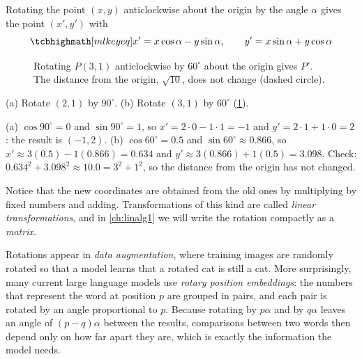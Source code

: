 \begin{theorem}\label{thm:rotation}
Rotating the point $(x, y)$ anticlockwise about the origin by the angle
$\alpha$ gives the point $(x', y')$ with
\[
  \keyeq{x' = x\cos\alpha - y\sin\alpha, \qquad y' = x\sin\alpha + y\cos\alpha}
\]
\end{theorem}

\begin{figure}[htbp]
\centering
{}
\caption{Rotating $P(3,1)$ anticlockwise by $60^\circ$ about the origin gives
  $P'$. The distance from the origin, $\sqrt{10}$, does not change (dashed
  circle).}
\label{fig:rotation}
\end{figure}

\begin{example}[Rotations]
(a) Rotate $(2, 1)$ by $90^\circ$. (b) Rotate $(3, 1)$ by $60^\circ$
(\cref{fig:rotation}).

\sol (a) $\cos90^\circ = 0$ and $\sin90^\circ = 1$, so $x' = 2\cdot0 - 1\cdot1
= -1$ and $y' = 2\cdot1 + 1\cdot0 = 2$: the result is $(-1, 2)$.
(b) $\cos60^\circ = 0.5$ and $\sin60^\circ \approx 0.866$, so
$x' \approx 3(0.5) - 1(0.866) = 0.634$ and $y' \approx 3(0.866) + 1(0.5) =
3.098$. Check: $0.634^2 + 3.098^2 \approx 10.0 = 3^2 + 1^2$, so the distance
from the origin has not changed.
\end{example}

Notice that the new coordinates are obtained from the old ones by multiplying
by fixed numbers and adding. Transformations of this kind are called
\emph{linear transformations}, and in \cref{ch:linalg1} we will write the
rotation compactly as a \emph{matrix}.

\begin{mlnote}
Rotations appear in \emph{data augmentation}, where training images are
randomly rotated so that a model learns that a rotated cat is still a cat.
More surprisingly, many current large language models use \emph{rotary position
embeddings}: the numbers that represent the word at position $p$ are grouped
in pairs, and each pair is rotated by an angle proportional to $p$. Because
rotating by $p\alpha$ and by $q\alpha$ leaves an angle of $(p-q)\alpha$
between the results, comparisons between two words then depend only on how far
apart they are, which is exactly the information the model needs.
\end{mlnote}

